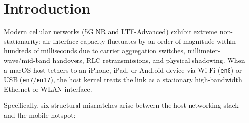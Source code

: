 \documentclass[11pt,a4paper]{article}
\theoremstyle{definition}
\begin{document}
\section{Introduction}

Modern cellular networks (5G NR and LTE-Advanced) exhibit extreme non-stationarity: air-interface capacity fluctuates by an order of magnitude within hundreds of milliseconds due to carrier aggregation switches, millimeter-wave/mid-band handovers, RLC retransmissions, and physical shadowing. When a macOS host tethers to an iPhone, iPad, or Android device via Wi-Fi (\texttt{en0}) or USB (\texttt{en7}/\texttt{en17}), the host kernel treats the link as a stationary high-bandwidth Ethernet or WLAN interface.

Specifically, six structural mismatches arise between the host networking stack and the mobile hotspot:
\end{document}
